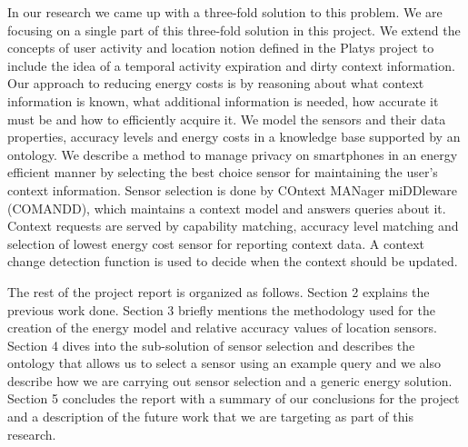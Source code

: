 \documentclass{ubicomp2013}
\begin{document}
In our research we came up with a three-fold solution to this problem. We are focusing on a single part of this three-fold solution in this project. We extend the concepts of user activity and location notion defined in the Platys project to include the idea of a temporal activity expiration and dirty context information. Our approach to reducing energy costs is by reasoning about what context information is known, what additional information is needed, how accurate it must be and how to efficiently acquire it. We model the sensors and their data properties, accuracy levels and energy costs in a knowledge base supported by an ontology. We describe a method to manage privacy on smartphones in an energy efficient manner by selecting the best choice sensor for maintaining the user's context information. Sensor selection is done by COntext MANager miDDleware (COMANDD), which maintains a context model and answers queries about it. Context requests are served by capability matching, accuracy level matching and selection of lowest energy cost sensor for reporting context data. A context change detection function is used to decide when the context should be updated.

The rest of the project report is organized as follows. Section 2 explains the previous work done. Section 3 briefly mentions the methodology used for the creation of the energy model and relative accuracy values of location sensors. Section 4 dives into the sub-solution of sensor selection and describes the ontology that allows us to select a sensor using an example query and we also describe how we are carrying out sensor selection and a generic energy solution. Section 5 concludes the report with a summary of our conclusions for the project and a description of the future work that we are targeting as part of this research. 
\end{document}
